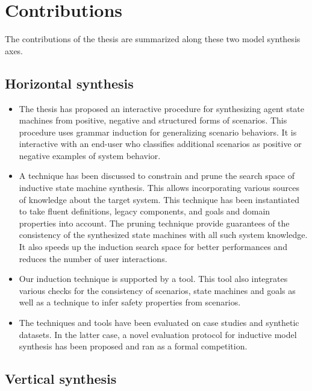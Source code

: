 \section{Contributions\label{section:conclusion-contributions}}

The contributions of the thesis are summarized along these two model synthesis axes.

\subsection*{Horizontal synthesis}

\begin{itemize}
\item The thesis has proposed an interactive procedure for synthesizing agent state machines from positive, negative and structured forms of scenarios. This procedure uses grammar induction for generalizing scenario behaviors. It is interactive with an end-user who classifies additional scenarios as positive or negative examples of system behavior.
\item A technique has been discussed to constrain and prune the search space of inductive state machine synthesis. This allows incorporating various sources of knowledge about the target system. This technique has been instantiated to take fluent definitions, legacy components, and goals and domain properties into account. The pruning technique provide guarantees of the consistency of the synthesized state machines with all such system knowledge. It also speeds up the induction search space for better performances and reduces the number of user interactions.
\item Our induction technique is supported by a tool. This tool also integrates various checks for the consistency of scenarios, state machines and goals as well as a technique to infer safety properties from scenarios. 
\item The techniques and tools have been evaluated on case studies and synthetic datasets. In the latter case, a novel evaluation protocol for inductive model synthesis has been proposed and ran as a formal competition.
\end{itemize}

\subsection*{Vertical synthesis}

